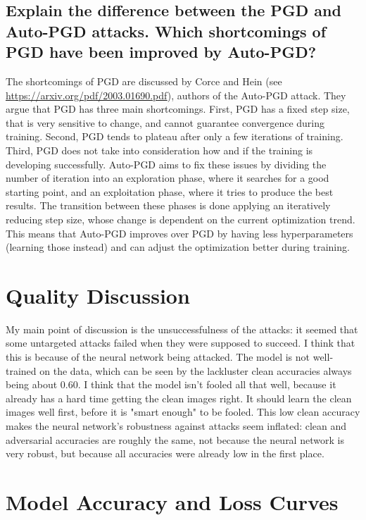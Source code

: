 \documentclass{article}
\begin{document}
\subsection{Explain the difference between the PGD and Auto-PGD attacks. Which
shortcomings of PGD have been improved by Auto-PGD?}
The shortcomings of PGD are discussed by Corce and Hein (see \url{https://arxiv.org/pdf/2003.01690.pdf}), authors of the Auto-PGD attack. 
They argue that PGD has three main shortcomings.
First, PGD has a fixed step size, that is very sensitive to change, and cannot guarantee convergence during training.
Second, PGD tends to plateau after only a few iterations of training.
Third, PGD does not take into consideration how and if the training is developing successfully.
Auto-PGD aims to fix these issues by dividing the number of iteration into an exploration phase, where it searches for a good starting point, and an exploitation phase, where it tries to produce the best results.
The transition between these phases is done applying an iteratively reducing step size, whose change is dependent on the current optimization trend.
This means that Auto-PGD improves over PGD by having less hyperparameters (learning those instead) and can adjust the optimization better during training.

\section{Quality Discussion}
My main point of discussion is the unsuccessfulness of the attacks: it seemed that some untargeted attacks failed when they were supposed to succeed.
I think that this is because of the neural network being attacked.
The model is not well-trained on the data, which can be seen by the lackluster clean accuracies always being about 0.60.
I think that the model isn't fooled all that well, because it already has a hard time getting the clean images right.
It should learn the clean images well first, before it is "smart enough" to be fooled.
This low clean accuracy makes the neural network's robustness against attacks seem inflated: clean and adversarial accuracies are roughly the same, not because the neural network is very robust, but because all accuracies were already low in the first place.

\appendix

\section{Model Accuracy and Loss Curves}
\label{sec:model_accuracy_and_loss_curves}
\end{document}
